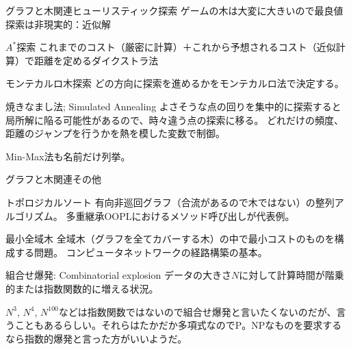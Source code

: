 \documentclass{beamer}
\begin{document}
\begin{frame}[fragile]{グラフと木関連}{ヒューリスティック探索}
ゲームの木は大変に大きいので最良値探索は非現実的：近似解

\begin{exampleblock}{$A^{*}$探索}
これまでのコスト（厳密に計算）＋これから予想されるコスト（近似計算）で距離を定めるダイクストラ法
\end{exampleblock}

\begin{exampleblock}{モンテカルロ木探索}
どの方向に探索を進めるかをモンテカルロ法で決定する。
\end{exampleblock}

\begin{exampleblock}{焼きなまし法; Simulated Annealing}
よさそうな点の回りを集中的に探索すると局所解に陥る可能性があるので、時々違う点の探索に移る。
どれだけの頻度、距離のジャンプを行うかを熱を模した変数で制御。
\end{exampleblock}

Min-Max法も名前だけ列挙。
\end{frame}

\begin{frame}[fragile]{グラフと木関連}{その他}
\begin{exampleblock}{トポロジカルソート}
有向非巡回グラフ（合流があるので木ではない）の整列アルゴリズム。
多重継承OOPLにおけるメソッド呼び出しが代表例。
\end{exampleblock}

\begin{exampleblock}{最小全域木}
全域木（グラフを全てカバーする木）の中で最小コストのものを構成する問題。
コンピュータネットワークの経路構築の基本。
\end{exampleblock}

\begin{exampleblock}{組合せ爆発: Combinatorial explosion}
データの大きさ$N$に対して計算時間が階乗的または指数関数的に増える状況。
\end{exampleblock}
{
\fontsize{6}{6}\selectfont
$N^3$, $N^4$, $N^{100}$などは指数関数ではないので組合せ爆発と言いたくないのだが、言うこともあるらしい。それらはたかだか多項式なのでP。NPなものを要求するなら指数的爆発と言った方がいいようだ。
}
\end{frame}
\end{document}
